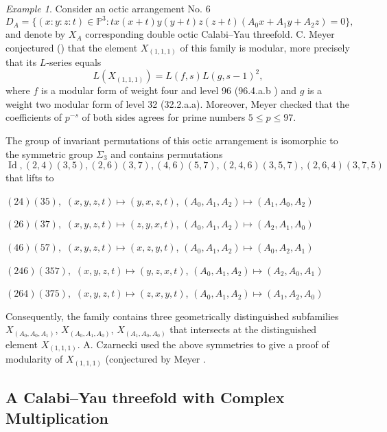 \documentclass[12pt]{amsart}
\theoremstyle{plain}
\theoremstyle{remark}
\newtheorem{exmp}{Example}
\theoremstyle{definition}
\newcommand{\PP}{\mathbb P}
\numberwithin{table}{section}
\begin{document}
\begin{exmp}
	Consider an octic arrangement No. 6
	\[D_{A}=\{(x:y:z:t)\in\PP^{3}: tx(x+t)y(y+t)z(z+t)(A_{0}x+A_{1}y+A_{2}z)=0\},\]
	and denote by $X_{A}$ corresponding double octic Calabi--Yau threefold. C. Meyer conjectured (\cite[p. 61]{Meyer}) that the element $X_{(1,1,1)}$ of this family is modular, more precisely that its $L$-series equals
	\[L(X_{(1,1,1)})=L(f,s)L(g,s-1)^{2},\]
	where $f$ is a modular form of weight four and level 96 (96.4.a.b \cite{LMFDB}) and $g$ is a weight two modular form of level 32 (32.2.a.a). Moreover, Meyer checked that the coefficients of $p^{-s}$ of both sides agrees for prime numbers $5\le p\le97$.

	The group of invariant permutations of this octic arrangement is isomorphic to the symmetric group $\Sigma_3$ and contains permutations
	\[\operatorname{Id}, (2,4)(3,5), (2,6)(3,7), (4,6)(5,7), (2,4,6)(3,5,7), (2,6,4)(3,7,5)\]
	that lifts to

	$\displaystyle (24)(35),$\phantom{12} \quad $(x,y,z,t)\mapsto (y,x,z,t)$, \quad $(A_0, A_1, A_2)\mapsto(A_1, A_0, A_2)$

	$\displaystyle (26)(37),$ \phantom{12}\quad $(x,y,z,t)\mapsto (z,y,x,t)$, \quad $(A_0, A_1, A_2)\mapsto(A_2, A_1, A_0)$

	$\displaystyle (46)(57),$ \phantom{12}\quad $(x,y,z,t)\mapsto (x,z,y,t)$, \quad $(A_0, A_1, A_2)\mapsto(A_0, A_2, A_1)$

	$\displaystyle (246)(357),$ \quad $(x,y,z,t)\mapsto (y,z,x,t)$, \quad $(A_0, A_1, A_2)\mapsto(A_2, A_0, A_1)$

	$\displaystyle (264)(375),$ \quad $(x,y,z,t)\mapsto (z,x,y,t)$, \quad $(A_0, A_1, A_2)\mapsto(A_1, A_2, A_0)$


Consequently, the family contains three geometrically distinguished subfamilies $X_{(A_{0},A_{0},A_{1})}$, $X_{(A_{0},A_{1},A_{0})}$, $X_{(A_{1},A_{0},A_{0})}$ that intersects at the distinguished element
$X_{(1,1,1)}$. A. Czarnecki \cite{czarnecki} used the above symmetries to give a proof of modularity of $X_{(1,1,1)}$
(conjectured by Meyer \cite[p. 61]{Meyer}.

\end{exmp}


\subsection{A Calabi--Yau threefold with Complex Multiplication}
\end{document}
